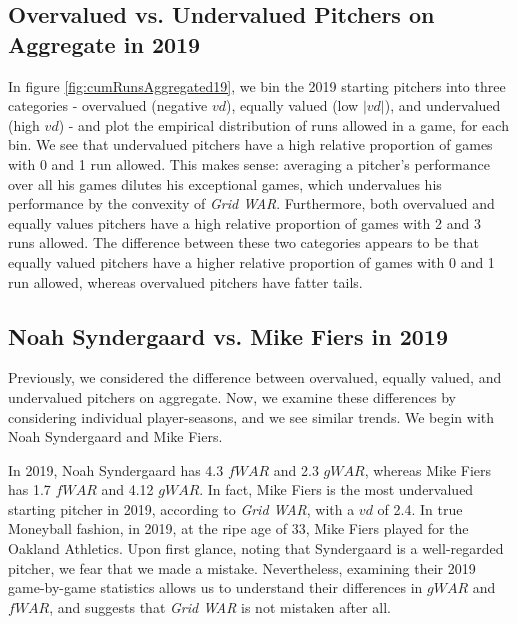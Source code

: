 \documentclass[12pt]{article}
\begin{document}
\subsection{Overvalued vs. Undervalued Pitchers on Aggregate in 2019}

In figure \ref{fig:cumRunsAggregated19}, we bin the 2019 starting pitchers into three categories - overvalued (negative $vd$), equally valued (low $|vd|$), and undervalued (high $vd$) - and plot the empirical distribution of runs allowed in a game, for each bin. We see that undervalued pitchers have a high relative proportion of games with 0 and 1 run allowed. This makes sense: averaging a pitcher's performance over all his games dilutes his exceptional games, which undervalues his performance by the convexity of \textit{Grid WAR}. Furthermore, both overvalued and equally values pitchers have a high relative proportion of games with 2 and 3 runs allowed. The difference between these two categories appears to be that equally valued pitchers have a higher relative proportion of games with 0 and 1 run allowed, whereas overvalued pitchers have fatter tails.


\subsection{Noah Syndergaard vs. Mike Fiers in 2019}

Previously, we considered the difference between overvalued, equally valued, and undervalued pitchers on aggregate. Now, we examine these differences by considering individual player-seasons, and we see similar trends. We begin with Noah Syndergaard and Mike Fiers. 

In 2019,  Noah Syndergaard has 4.3 $fWAR$ and 2.3 $gWAR$, whereas Mike Fiers has 1.7 $fWAR$ and 4.12 $gWAR$. In fact, Mike Fiers is the most undervalued starting pitcher in 2019, according to \textit{Grid WAR}, with a $vd$ of 2.4. In true Moneyball fashion, in 2019, at the ripe age of 33, Mike Fiers played for the Oakland Athletics. Upon first glance, noting that Syndergaard is a well-regarded pitcher, we fear that we made a mistake. Nevertheless, examining their 2019 game-by-game statistics allows us to understand their differences in $gWAR$ and $fWAR$, and suggests that \textit{Grid WAR} is not mistaken after all.
\end{document}
